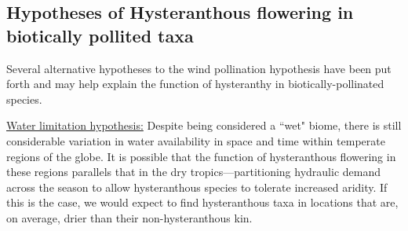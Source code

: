 \documentclass{article}[11pt]
\begin{document}

\subsection*{Hypotheses of Hysteranthous flowering in biotically pollited taxa}
Several alternative hypotheses to the wind pollination hypothesis have been put forth and may help explain the function of hysteranthy in biotically-pollinated species.  
 
\underline{Water limitation hypothesis:} Despite being considered a ``wet" biome, there is still considerable variation in water availability in space and time within temperate regions of the globe. It is possible that the function of hysteranthous flowering in these regions parallels that in the dry tropics---partitioning hydraulic demand across the season to allow hysteranthous species to tolerate increased aridity. If this is the case, we would expect to find hysteranthous taxa in locations that are, on average, drier than their non-hysteranthous kin.

\end{document}
